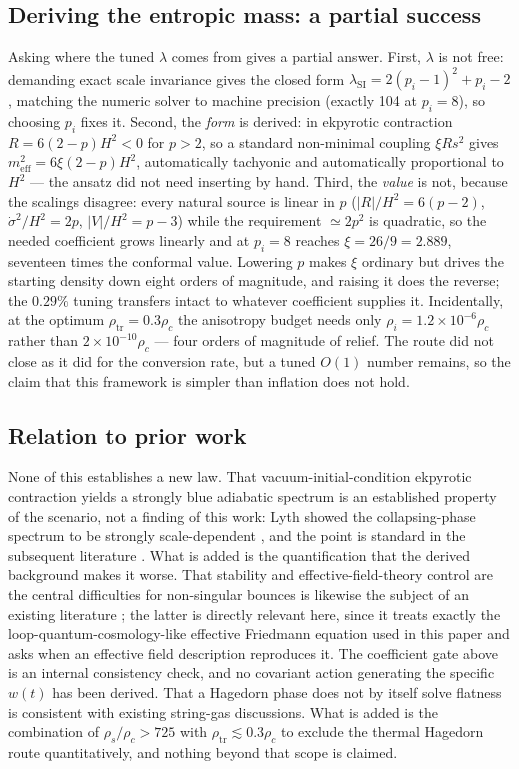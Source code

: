 \documentclass[a4paper,11pt]{article}
\begin{document}
\subsection{Deriving the entropic mass: a partial success}
 Asking where the tuned $\lambda$ comes from gives a partial answer. First, $\lambda$ is not free: demanding exact scale invariance gives the closed form $\lambda_{\mathrm{SI}}=2(p_i-1)^2+p_i-2$, matching the numeric solver to machine precision (exactly 104 at $p_i=8$), so choosing $p_i$ fixes it. Second, the \emph{form} is derived: in ekpyrotic contraction $R=6(2-p)H^2<0$ for $p>2$, so a standard non-minimal coupling $\xi Rs^2$ gives $m_{\mathrm{eff}}^2=6\xi(2-p)H^2$, automatically tachyonic and automatically proportional to $H^2$ --- the ansatz did not need inserting by hand. Third, the \emph{value} is not, because the scalings disagree: every natural source is linear in $p$ ($|R|/H^2=6(p-2)$, $\dot\sigma^2/H^2=2p$, $|V|/H^2=p-3$) while the requirement $\simeq2p^2$ is quadratic, so the needed coefficient grows linearly and at $p_i=8$ reaches $\xi=26/9=2.889$, seventeen times the conformal value. Lowering $p$ makes $\xi$ ordinary but drives the starting density down eight orders of magnitude, and raising it does the reverse; the $0.29\%$ tuning transfers intact to whatever coefficient supplies it. Incidentally, at the optimum $\rho_{\mathrm{tr}}=0.3\rho_c$ the anisotropy budget needs only $\rho_i=1.2\times10^{-6}\rho_c$ rather than $2\times10^{-10}\rho_c$ --- four orders of magnitude of relief. The route did not close as it did for the conversion rate, but a tuned $O(1)$ number remains, so the claim that this framework is simpler than inflation does not hold.

\subsection{Relation to prior work}
 None of this establishes a new law. That vacuum-initial-condition ekpyrotic contraction yields a strongly blue adiabatic spectrum is an established property of the scenario, not a finding of this work: Lyth showed the collapsing-phase spectrum to be strongly scale-dependent \cite{Lyth02}, and the point is standard in the subsequent literature \cite{Lehners08,CEB12}. What is added is the quantification that the derived background makes it worse. That stability and effective-field-theory control are the central difficulties for non-singular bounces is likewise the subject of an existing literature \cite{Ijjas18,CWE14}; the latter is directly relevant here, since it treats exactly the loop-quantum-cosmology-like effective Friedmann equation used in this paper and asks when an effective field description reproduces it. The coefficient gate above is an internal consistency check, and no covariant action generating the specific $w(t)$ has been derived. That a Hagedorn phase does not by itself solve flatness is consistent with existing string-gas discussions. What is added is the combination of $\rho_s/\rho_c>725$ with $\rho_{\mathrm{tr}}\lesssim0.3\rho_c$ to exclude the thermal Hagedorn route quantitatively, and nothing beyond that scope is claimed.
\end{document}
